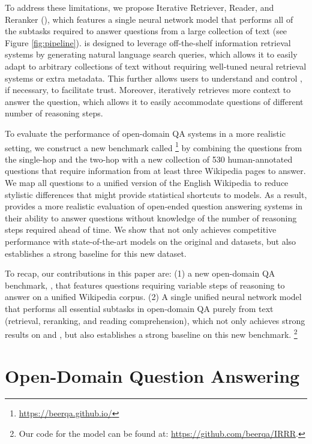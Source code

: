 To address these limitations, we propose Iterative Retriever, Reader, and Reranker (\irrr{}), which features a single neural network model that performs all of the subtasks required to answer questions from a large collection of text (see Figure \ref{fig:pipeline}).
\irrr{} is designed to leverage off-the-shelf information retrieval systems by generating natural language search queries, which allows it to easily adapt to arbitrary collections of text without requiring well-tuned neural retrieval systems or extra metadata.
This further allows users to understand and control \irrr{}, if necessary, to facilitate trust.
Moreover, \irrr{} iteratively retrieves more context to answer the question, which allows it to easily accommodate questions of different number of reasoning steps.

To evaluate the performance of open-domain QA systems in a more realistic setting, we construct a new benchmark called \beerqa{}\footnote{\url{https://beerqa.github.io/}} by combining the questions from the single-hop \squadopen{} \citep{rajpurkar2016squad, chen2017reading} and the two-hop \hotpotqa{} \citep{yang2018hotpotqa} with a new collection of 530 human-annotated questions that require information from at least three Wikipedia pages to answer.
We map all questions to a unified version of the English Wikipedia to reduce stylistic differences that might provide statistical shortcuts to models.
As a result, \beerqa{} provides a more realistic evaluation of open-ended question answering systems in their ability to answer questions without knowledge of the number of reasoning steps required ahead of time.
We show that \irrr{} not only achieves competitive performance with state-of-the-art models on the original \squadopen{} and \hotpotqa{} datasets, but also establishes a strong baseline for this new dataset.

To recap, our contributions in this paper are: (1)
a new open-domain QA benchmark, \beerqa, that features questions requiring variable steps of reasoning to answer on a unified Wikipedia corpus.
(2) A single unified neural network model that performs all essential subtasks in open-domain QA purely from text (retrieval, reranking, and reading comprehension), which not only achieves strong results on \squad{} and \hotpotqa{}, but also establishes a strong baseline on this new benchmark.%
\footnote{Our code for the model can be found at: \url{https://github.com/beerqa/IRRR}.}

\section{Open-Domain Question Answering}

